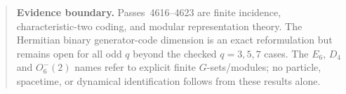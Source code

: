 \begin{quote}\small
\textbf{Evidence boundary.} Passes~4616--4623 are finite incidence,
characteristic-two coding, and modular representation theory.  The Hermitian
binary generator-code dimension is an exact reformulation but remains open for
all odd $q$ beyond the checked $q=3,5,7$ cases.  The $E_6$, $D_4$ and
$O^-_6(2)$ names refer to explicit finite $G$-sets/modules; no particle,
spacetime, or dynamical identification follows from these results alone.
\end{quote}
